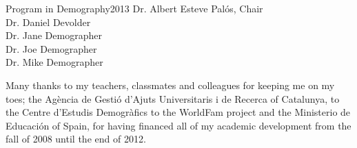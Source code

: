 \documentclass[reqno,12pt,oneside,a4paper]{report} %
\theoremstyle{plain}
\theoremstyle{definition}
\theoremstyle{remark}
\numberwithin{theorem}{chapter}     %
\begin{document}



{Program in Demography}{2013}
{Dr. Albert Esteve Pal\'{o}s, Chair\\
 Dr. Daniel Devolder\\
 Dr. Jane Demographer\\
 Dr. Joe Demographer\\
 Dr. Mike Demographer}

\initializefrontsections



\makeatletter
\if@twoside \setcounter{page}{4} \else \setcounter{page}{1} \fi
\makeatother
 

\startacknowledgementspage
% 
Many thanks to my teachers, classmates and colleagues for keeping me on my toes; the Ag\`{e}ncia de Gesti\'{o} d'Ajuts 
Universitaris i de Recerca of Catalunya, to the Centre d'Estudis Demogr\`{a}fics to the WorldFam project and the Ministerio de Educaci\'{o}n of Spain, 
for having financed all of my academic development from the fall of 2008 until the end of 2012. 
\label{Acknowledgements}

%

\tableofcontents     %
\listoffigures       %
\end{document}
